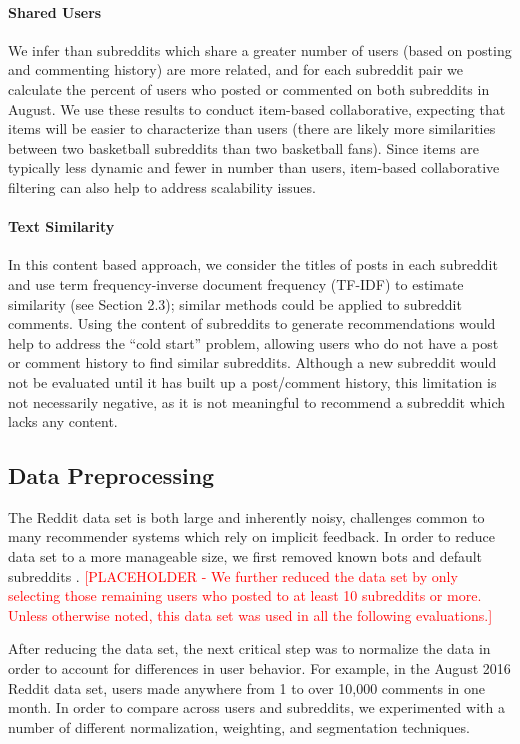 \documentclass{article}
\begin{document}
\paragraph{Shared Users} We infer than subreddits which share a greater number of users (based on posting and commenting history) are more related, and for each subreddit pair we calculate the percent of users who posted or commented on both subreddits in August.  We use these results to conduct item-based collaborative, expecting that items will be easier to characterize than users (there are likely more similarities between two basketball subreddits than two basketball fans).  Since items are typically less dynamic and fewer in number than users, item-based collaborative filtering can also help to address scalability issues.

\paragraph{Text Similarity} In this content based approach, we consider the titles of posts in each subreddit and use term frequency-inverse document frequency (TF-IDF) to estimate similarity (see Section 2.3); similar methods could be applied to subreddit comments. Using the content of subreddits to generate recommendations would help to address the “cold start” problem, allowing users who do not have a post or comment history to find similar subreddits.  Although a new subreddit would not be evaluated until it has built up a post/comment history, this limitation is not necessarily negative, as it is not meaningful to recommend a subreddit which lacks any content.

\subsection{Data Preprocessing}
The Reddit data set is both large and inherently noisy, challenges common to many recommender systems which rely on implicit feedback.  In order to reduce data set to a more manageable size, we first removed known bots  and default subreddits .  \textcolor{red}{[PLACEHOLDER - We further reduced the data set by only selecting those remaining users who posted to at least 10 subreddits or more.  Unless otherwise noted, this data set was used in all the following evaluations.]} 

After reducing the data set, the next critical step was to normalize the data in order to account for differences in user behavior.  For example, in the August 2016 Reddit data set, users made anywhere from 1 to over 10,000 comments in one month.  In order to compare across users and subreddits, we experimented with a number of different normalization, weighting, and segmentation techniques.
\end{document}
